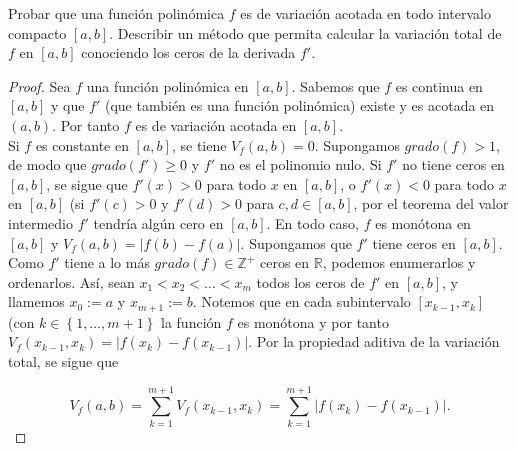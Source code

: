 \setcounter{section}{6}
\setcounter{exercise}{2}
\begin{exercise}

  Probar que una función polinómica $f$ es de variación acotada en todo intervalo compacto $\left[a,b\right]$. Describir un método que permita calcular la variación total de $f$ en $\left[a,b\right]$ conociendo los ceros de la derivada $f'$.

\end{exercise}

\begin{proof}

Sea $f$ una función polinómica en $\left[a,b\right]$. Sabemos que $f$ es continua en $\left[a,b\right]$ y que $f'$ (que también es una función polinómica) existe y es acotada en $\left(a,b\right)$. Por tanto $f$ es de variación acotada en $\left[a,b\right]$.\\
Si $f$ es constante en $\left[a,b\right]$, se tiene $V_f\left(a,b\right)=0$. Supongamos $grado\left(f\right)>1$, de modo que $grado\left(f'\right)\geq 0$ y $f'$ no es el polinomio nulo. Si $f'$ no tiene ceros en $\left[a,b\right]$, se sigue que $f'\left(x\right)>0$ para todo $x$ en $\left[a,b\right]$, o $f'\left(x\right)<0$ para todo $x$ en $\left[a,b\right]$ (si $f'\left(c\right)>0$ y $f'\left(d\right)>0$ para $c,d\in \left[a,b\right]$, por el teorema del valor intermedio $f'$ tendría algún cero en $\left[a,b\right]$. En todo caso, $f$ es monótona en $\left[a,b\right]$ y $V_f\left(a,b\right)=|f\left(b\right)-f\left(a\right)|$. Supongamos que $f'$ tiene ceros en $\left[a,b\right]$. Como $f'$ tiene a lo más $grado\left(f\right)\in \mathds{Z}^{+}$ ceros en $\mathds{R}$, podemos enumerarlos y ordenarlos. Así, sean $x_1<x_2<\dots<x_m$ todos los ceros de $f'$ en $\left[a,b\right]$, y llamemos $x_0:=a$ y $x_{m+1}:=b$. Notemos que en cada subintervalo $\left[x_{k-1},x_k\right]$ (con $k\in \left\lbrace 1,\dots, m+1 \right\rbrace$ la función $f$ es monótona y por tanto $V_f\left(x_{k-1},x_k\right)=|f\left(x_k\right)-f\left(x_{k-1}\right)|$. Por la propiedad aditiva de la variación total, se sigue que

\begin{equation*}
  V_f\left(a,b\right)=\sum_{k=1}^{m+1}V_f\left(x_{k-1},x_k\right)=\sum_{k=1}^{m+1}|f\left(x_k\right)-f\left(x_{k-1}\right)|.
\end{equation*}

\end{proof}
